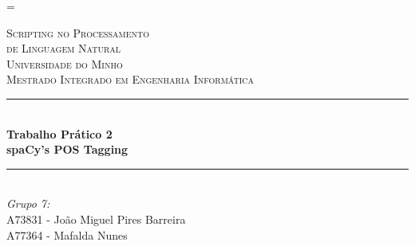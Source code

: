 \documentclass[12pt]{article}
\begin{document}
\sloppy
\LTcapwidth=\textwidth

\begin{titlepage}

\newcommand{\HRule}{\rule{\linewidth}{0.5mm}} %

\center %

\vspace{0.5cm}
 

\textsc{\LARGE Scripting no Processamento}\\[0.3cm]
\textsc{\LARGE de Linguagem Natural}\\[1.1cm] %
\textsc{\Large Universidade do Minho}\\[0.5cm] %
\textsc{\large Mestrado Integrado em Engenharia Informática}\\[0.5cm] %

\vspace{0.8cm}
\HRule \\[0.6cm]
{ \huge \bfseries Trabalho Prático 2}\\[0.4cm] %
{ \Large \bfseries spaCy's POS Tagging}\\[0.4cm] %
\HRule \\[1.0cm]
 

\Large \emph{Grupo 7:}\\
A73831 - João Miguel Pires Barreira\\
A77364 - Mafalda Nunes\\[1.3cm]



\end{titlepage}
\end{document}
